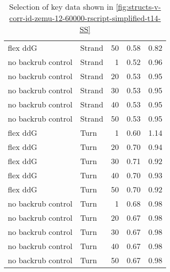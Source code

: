 \begin{table}
\begin{tabular}{llrrr}
           flex ddG &       Strand &      50 & 0.58 & 0.82 \\
 no backrub control &       Strand &       1 & 0.52 & 0.96 \\
 no backrub control &       Strand &      20 & 0.53 & 0.95 \\
 no backrub control &       Strand &      30 & 0.53 & 0.95 \\
 no backrub control &       Strand &      40 & 0.53 & 0.95 \\
 no backrub control &       Strand &      50 & 0.53 & 0.95 \\
           flex ddG &         Turn &       1 & 0.60 & 1.14 \\
           flex ddG &         Turn &      20 & 0.70 & 0.94 \\
           flex ddG &         Turn &      30 & 0.71 & 0.92 \\
           flex ddG &         Turn &      40 & 0.70 & 0.93 \\
           flex ddG &         Turn &      50 & 0.70 & 0.92 \\
 no backrub control &         Turn &       1 & 0.68 & 0.98 \\
 no backrub control &         Turn &      20 & 0.67 & 0.98 \\
 no backrub control &         Turn &      30 & 0.67 & 0.98 \\
 no backrub control &         Turn &      40 & 0.67 & 0.98 \\
 no backrub control &         Turn &      50 & 0.67 & 0.98 \\
\bottomrule
\end{tabular}

\caption[]{Selection of key data shown in \cref{fig:structs-v-corr-id-zemu-12-60000-rscript-simplified-t14-SS}}
\label{tab:structs-v-corr-id-zemu-12-60000-rscript-simplified-t14-SS-underlying-data}
\end{table}
